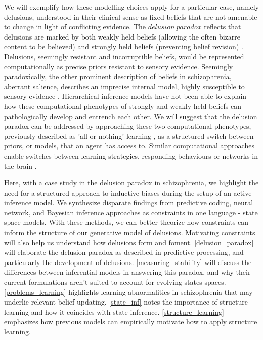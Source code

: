 \documentclass{article}
\begin{document}
We will exemplify how these modelling choices apply for a particular case, namely delusions, understood in their clinical sense as fixed beliefs that are not amenable to change in light of conflicting evidence. The $delusion\ paradox$ reflects that delusions are marked by both weakly held beliefs (allowing the often bizarre content to be believed) and strongly held beliefs (preventing belief revision) \citep{petrovic2023resolving}. Delusions, seemingly resistant and incorruptible beliefs, would be represented computationally as precise priors resistant to sensory evidence. Seemingly paradoxically, the other prominent description of beliefs in schizophrenia, aberrant salience, describes an imprecise internal model, highly susceptible to sensory evidence \citep{kapur2003psychosis}. Hierarchical inference models have not been able to explain how these computational phenotypes of strongly and weakly held beliefs can pathologically develop and entrench each other. We will suggest that the delusion paradox can be addressed by approaching these two computational phenotypes, previously described as 'all-or-nothing' learning \cite{nassar2021all}, as a structured switch between priors, or models, that an agent has access to. Similar computational approaches enable switches between learning strategies, responding behaviours or networks in the brain \citep{kolling2024role, cole2024cognitive}. 

Here, with a case study in the delusion paradox in schizophrenia, we highlight the need for a structured approach to inductive biases during the setup of an active inference model. We synthesize disparate findings from predictive coding, neural network, and Bayesian inference approaches as constraints in one language - state space models. With these methods, we can better theorize how constraints can inform the structure of our generative model of delusions. Motivating constraints will also help us understand how delusions form and foment. \ref{delusion_paradox} will elaborate the delusion paradox as described in predictive processing, and particularly the development of delusions. \ref{measuring_stability} will discuss the differences between inferential models in answering this paradox, and why their current formulations aren't suited to account for evolving states spaces. \ref{problems_learning} highlights learning abnormalities in schizophrenia that may underlie relevant belief updating. \ref{state_inf} notes the importance of structure learning and how it coincides with state inference. \ref{structure_learning} emphasizes how previous models can empirically motivate how to apply structure learning.
\end{document}
